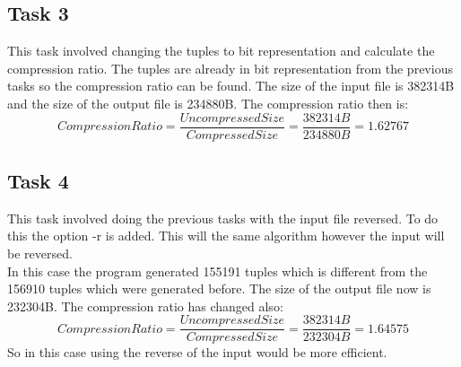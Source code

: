 \documentclass[]{article}
\newcommand\tab[1][1cm]{\hspace*{#1}}
\begin{document}
\subsection{Task 3}
\tab This task involved changing the tuples to bit representation and calculate
the compression ratio. The tuples are already in bit representation from the
previous tasks so the compression ratio can be found. The size of the input file
is 382314B and the size of the output file is 234880B. The compression ratio then
is:
\begin{equation}
	Compression Ratio = \frac{Uncompressed Size}{Compressed Size} = \frac{382314B}{234880B} = 1.62767
\end{equation}


\subsection{Task 4}
\tab This task involved doing the previous tasks with the input file 
reversed. To do this the option -r is added. This will the same 
algorithm however the input will be reversed.\\
\tab In this case the program generated 155191 tuples which is different from
the 156910 tuples which were generated before. The size of the output file
now is 232304B. The compression ratio has changed also:
\begin{equation}
	Compression Ratio = \frac{Uncompressed Size}{Compressed Size} = \frac{382314B}{232304B} = 1.64575
\end{equation}
So in this case using the reverse of the input would be more efficient.

	
\end{document}
